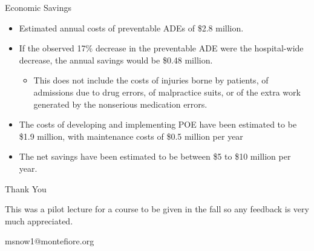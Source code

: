 \documentclass[10pt]{beamer}
\begin{document}
\begin{frame}{Economic Savings}
	\begin{itemize}
		\item Estimated annual costs of preventable ADEs of \$2.8 million. 
		\item If the observed 17\% decrease in the preventable ADE were the hospital-wide decrease, the annual savings would be \$0.48 million. 
		\begin{itemize}
			\item This does not include the costs of injuries borne by patients, of admissions due to drug errors, of malpractice suits, or of the extra work generated by the nonserious medication errors. 
		\end{itemize}
		\item The costs of developing and implementing POE have been estimated to be \$1.9 million, with maintenance costs of \$0.5 million per year
		\item The net savings have been estimated to be between \$5 to \$10 million per year.
	\end{itemize}
\end{frame}


\begin{frame}
	\begin{center}
 		{\Huge Thank You}
 		
 		\vspace{2cm}
 		This was a pilot lecture for a course to be given in the fall so any feedback is very much appreciated.
 		
 		\vspace{1.5cm}
 		
 		msnow1@montefiore.org
	\end{center}

\end{frame}
\end{document}
